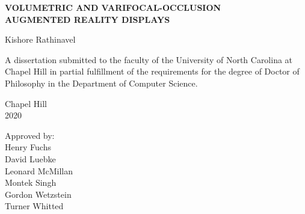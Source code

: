 \begin{titlepage}
\begin{center}


\vspace{2in}
\begin{singlespace}
\Large \bf
VOLUMETRIC AND VARIFOCAL-OCCLUSION\\ AUGMENTED REALITY DISPLAYS 
\end{singlespace}


\vspace{61pt} %
\large Kishore Rathinavel
\end{center}



\vspace{50pt}
\begin{singlespace}
\noindent \large
A dissertation submitted to the faculty of the University of North Carolina at Chapel Hill
in partial fulfillment of the requirements for the degree of Doctor of Philosophy in
the Department of Computer Science.
\end{singlespace}


\vspace{50pt}
\begin{center}
\begin{singlespace} \large
Chapel Hill\\
2020
\end{singlespace}
\end{center}


\vfill
\begin{flushright}
\begin{minipage}[t]{1.5in} \large
Approved by:\\
Henry Fuchs\\
David Luebke\\
Leonard McMillan\\
Montek Singh\\
Gordon Wetzstein\\
Turner Whitted
\end{minipage}
\end{flushright}

\end{titlepage}